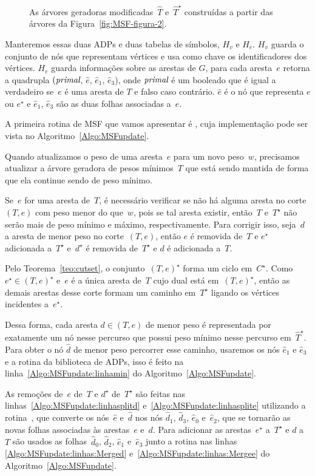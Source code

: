 \begin{figure}[htb]
\centering

\caption{As árvores geradoras modificadas~$\hat T$ e~$\hat T^\star$ construídas a partir das árvores da Figura~\ref{fig:MSF-figura-2}.}
\label{fig:MSF-figura-3}
\end{figure}
Manteremos essas duas ADPs e duas tabelas de símbolos, $H_v$ e $H_e$. $H_v$ guarda o conjunto de nós que representam vértices e usa como chave os identificadores dos vértices.
$H_e$ guarda informações sobre as arestas de $G$, para cada aresta~$e$ retorna a quadrupla $(\textit{primal}$, $\hat e$, $\hat e_1$, $\hat e_3$), onde $\textit{primal}$ é um booleado que é igual a verdadeiro se~$e$ é uma aresta de $T$ e falso caso contrário. $\hat e$ é o nó que representa $e$ ou $e^\star$ e $\hat e_1$, $\hat e_3$ são as duas folhas associadas a~$e$. 

A primeira rotina de MSF que vamos apresentar é \MSFupdate{}, cuja implementação pode ser vista no Algoritmo~\ref{Algo:MSFupdate}.

Quando atualizamos o peso de uma aresta~$e$ para um novo peso~$w$, precisamos atualizar a árvore geradora de pesos mínimos~$T$ que está sendo mantida de forma que ela continue sendo de peso mínimo.

Se~$e$ for uma aresta de~$T$, é necessário verificar se não há alguma aresta no corte~$(T, e)$ com peso menor do que~$w$, pois se tal aresta existir, então~$T$ e~$T^\star$ não serão mais de peso mínimo e máximo, respectivamente.
Para corrigir isso, seja~$d$ a aresta de menor peso no corte~$(T, e)$,
então $e$ é removida de~$T$ e $e^\star$ adicionada a~$T^\star$ e~$d^\star$ é removida de~$T^\star$ e $d$ é adicionada a~$T$.

Pelo Teorema~\ref{teo:cutset}, o conjunto~$(T, e)^\star$ forma um ciclo em~$C^\star$.
Como~$e^\star \in (T, e)^\star$ e~$e$ é a única aresta de~$T$ cujo dual está em~$(T, e)^\star$, então as demais arestas desse corte formam um caminho em~$T^\star$ ligando os vértices incidentes a~$e^\star$.

Dessa forma, cada aresta $d\in (T, e)$ de menor peso é representada por exatamente um nó nesse percurso que possui peso mínimo nesse percurso em~$\hat T^\star$.
Para obter o nó $\hat d$ de menor peso percorrer esse caminho, usaremos os nós $\hat e_1$ e $\hat e_3$ e a rotina \LCOMin{} da biblioteca de ADPs, isso é feito na linha~\ref{Algo:MSFupdate:linhamin} do Algoritmo~\ref{Algo:MSFupdate}.

As remoções de~$e$ de~$T$ e $d^\star$ de~$T^\star$ são feitas nas linhas~\ref{Algo:MSFupdate:linhasplitd} e~\ref{Algo:MSFupdate:linhasplite} utilizando a rotina~\LCOSplit{}, que converte os nós~$\hat e$ e~$\hat d$ nos nós $\hat d_1$, $\hat d_3$, $\hat e_0$ e~$\hat e_2$, que se tornarão as novas folhas associadas às arestas~$e$ e~$d$.
Para adicionar as arestas~$e^\star$ a~$T^\star$ e $d$ a~$T$ são usados as folhas~$\hat d_0$, $\hat d_2$, $\hat e_1$ e~$\hat e_3$ junto a rotina \LCOMerge{} nas linhas \ref{Algo:MSFupdate:linhas:Merged} e~\ref{Algo:MSFupdate:linhas:Mergee} do Algoritmo~\ref{Algo:MSFupdate}.


